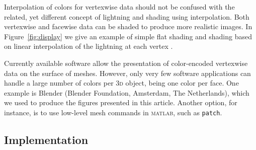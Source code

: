 Interpolation of colors for vertexwise data should not be confused with the related, yet different concept of lightning and shading using interpolation. Both vertexwise and facewise data can be shaded to produce more realistic images. In Figure~\ref{fig:display} we give an example of simple flat shading and shading based on linear interpolation of the lightning at each vertex \citep{Gouraud1971}.

Currently available software allow the presentation of color-encoded vertexwise data on the surface of meshes. However, only very few software applications can handle a large number of colors per \textsc{3d} object, being one color per face. One example is Blender (Blender Foundation, Amsterdam, The Netherlands), which we used to produce the figures presented in this article. Another option, for instance, is to use low-level mesh commands in \textsc{matlab}, such as \texttt{patch}.

\subsection{Implementation}
\label{sec:implementation}

